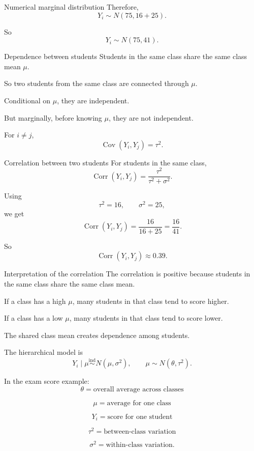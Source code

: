 \documentclass[aspectratio=43,11pt]{beamer}
\begin{document}
{\begin{frame}{Numerical marginal distribution}
\medskip
Therefore,
\[
Y_i \sim N(75,16+25).
\]

\medskip
So
\[
Y_i \sim N(75,41).
\]
\end{frame}

\begin{frame}{Dependence between students}
Students in the same class share the same class mean \(\mu\).

\medskip
So two students from the same class are connected through \(\mu\).

\medskip
Conditional on \(\mu\), they are independent.

\medskip
But marginally, before knowing \(\mu\), they are not independent.

\medskip
For \(i \neq j\),
\[
\operatorname{Cov}(Y_i,Y_j)=\tau^2.
\]
\end{frame}

\begin{frame}{Correlation between two students}
For students in the same class,
\[
\operatorname{Corr}(Y_i,Y_j)
=
\frac{\tau^2}{\tau^2+\sigma^2}.
\]

\medskip
Using
\[
\tau^2=16,
\qquad
\sigma^2=25,
\]
we get
\[
\operatorname{Corr}(Y_i,Y_j)
=
\frac{16}{16+25}
=
\frac{16}{41}.
\]

\medskip
So
\[
\operatorname{Corr}(Y_i,Y_j)\approx 0.39.
\]
\end{frame}

\begin{frame}{Interpretation of the correlation}
The correlation is positive because students in the same class share the same class mean.

\medskip
If a class has a high \(\mu\), many students in that class tend to score higher.

\medskip
If a class has a low \(\mu\), many students in that class tend to score lower.

\medskip
The shared class mean creates dependence among students.
\end{frame}

\begin{frame}{}
The hierarchical model is
\[
Y_i \mid \mu \overset{\text{ind}}{\sim} N(\mu,\sigma^2),
\qquad
\mu \sim N(\theta,\tau^2).
\]

\medskip
In the exam score example:
\[
\theta = \text{overall average across classes}
\]

\[
\mu = \text{average for one class}
\]

\[
Y_i = \text{score for one student}
\]

\[
\tau^2 = \text{between-class variation}
\]

\[
\sigma^2 = \text{within-class variation}.
\]
\end{frame}
}
\end{document}
